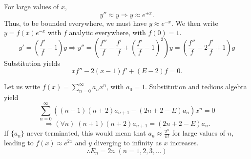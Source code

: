 \item
For large values of $x$,
\[
	y'' \approx y
	\Rightarrow y \approx e^{\pm x}.
\]
Thus, to be bounded everywhere, we must have $y \approx e^{-x}$.
We then write $y = f(x) e^{-x}$ with $f$ analytic everywhere, with $f(0) = 1$.
\[
	y' = \left( \frac{f'}{f} - 1 \right) y
	\Rightarrow y'' = \left( \frac{f''}{f} - \frac{f'}{f} + {\left( \frac{f'}{f} - 1 \right)}^2 \right) y
	= \left( \frac{f''}{f} - 2 \frac{f'}{f} + 1 \right) y
\]
Substitution yields
\[
	xf'' - 2(x - 1)f' + (E - 2)f = 0.
\]

Let us write $f(x) = \sum_{n=0}^\infty a_n x^n$, with $a_0 = 1$.
Substitution and tedious algebra yield
\[
	\sum_{n=0}^\infty ((n + 1)(n + 2)a_{n + 1} - (2n + 2 - E) a_n) x^n = 0
\]
\[
	\Rightarrow (\forall n)\; (n + 1)(n + 2)a_{n + 1} = (2n + 2 - E) a_n.
\]
If $\{a_n\}$ never terminated, this would mean that $a_n \approx \frac{2^n}{n!}$ for large values of $n$,
leading to $f(x) \approx e^{2x}$ and $y$ diverging to infinity as $x$ increases.
\[
	\therefore E_n = 2n\; (n = 1, 2, 3, \dots)
\]